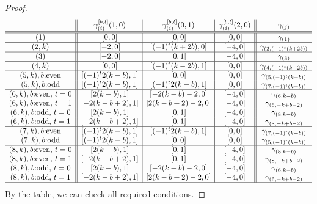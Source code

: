 \documentclass[12pt]{amsart}
\theoremstyle{definition}
\begin{document}
\begin{proof}
  {\small
  $$\begin{array}{c||c|c|c||c}
    & \gamma_{(i)}^{[b,t]}(1,0)
    & \gamma_{(i)}^{[b,t]}(0,1)
    & \gamma_{(i)}^{[b,t]}(2,0) & \gamma_{(j)}\\
    \hline
    \hline
    (1) & [0,0] & [0,0] & [0,0] & \gamma_{(1)}\\
    \hline
    (2,k) & [-2,0] & [(-1)^t(k+2b),0] & [-4,0]& \gamma_{(2,(-1)^t(k+2b))}\\
    \hline
    (3) & [-2,0] & [0,1] & [-4,0] & \gamma_{(3)}\\
    \hline
    (4,k) & [0,0] & [(-1)^t(k-2b),1] & [0,0] & \gamma_{(4,(-1)^t(k-2b))}\\
    \hline
    (5,k), \text{$b$:even} & [(-1)^t2(k-b),1] & [0,0] & [0,0] & \gamma_{(5,(-1)^t(k-b))}\\
    (5,k), \text{$b$:odd} & [(-1)^t2(k-b),1]  & [(-1)^t2(k-b),1] & [0,0]
                                & \gamma_{(7,(-1)^t(k-b))}\\
    \hline
    (6,k), \text{$b$:even, $t=0$} & [2(k-b),1] & [-2(k-b)-2,0] & [-4,0] &\gamma_{(6,k-b)}\\
    (6,k), \text{$b$:even, $t=1$} & [-2(k-b+2),1] & [2(k-b+2)-2,0] & [-4,0]&\gamma_{(6,-k+b-2)}\\
    (6,k), \text{$b$:odd, $t=0$} & [2(k-b),1] & [0,1] & [-4,0]&\gamma_{(8,k-b)}\\
    (6,k), \text{$b$:odd, $t=1$} & [-2(k-b+2),1] & [0,1] & [-4,0]&\gamma_{(8,-k+b-2)}\\
    \hline
    (7,k), \text{$b$:even}  & [(-1)^t2(k-b),1] & [(-1)^t2(k-b),1] & [0,0]
                                &\gamma_{(7,(-1)^t(k-b))}\\
    (7,k), \text{$b$:odd}  & [(-1)^t2(k-b),1] & [0,0] & [0,0]
                                &\gamma_{(5,(-1)^t(k-b))}\\
    \hline
    (8,k), \text{$b$:even, $t=0$}& [2(k-b),1] & [0,1] & [-4,0]&\gamma_{(8,k-b)}\\
    (8,k), \text{$b$:even, $t=1$}& [-2(k-b+2),1] & [0,1] & [-4,0]&\gamma_{(8,-k+b-2)}\\
    (8,k), \text{$b$:odd, $t=0$}& [2(k-b),1] & [-2(k-b)-2,0] & [-4,0]&\gamma_{(6,k-b)}\\
    (8,k), \text{$b$:odd, $t=1$}& [-2(k-b+2),1] & [2(k-b+2)-2,0] & [-4,0]&\gamma_{(6,-k+b-2)}\\
    \hline
  \end{array}$$}
  By the table, we can check all required conditions.
\end{proof}
\end{document}
